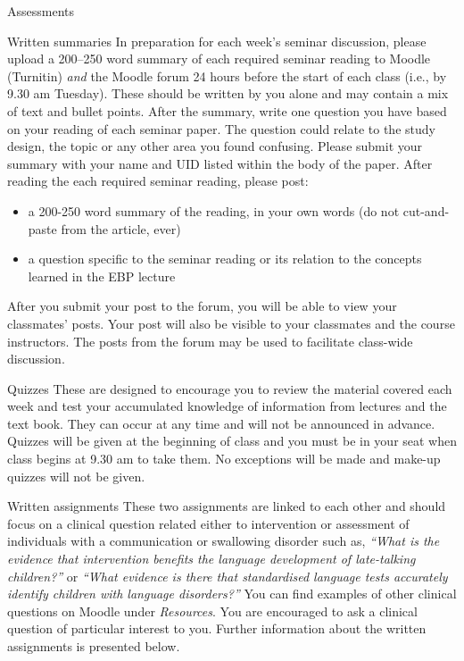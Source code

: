 \documentclass[a4paper, 11pt]{article}
\begin{document}
\begin{labeling}{Assessments}
\item[Written summaries] In preparation for each week's seminar discussion, please upload a 200--250 word summary of each required seminar reading to Moodle (Turnitin) \emph{and} the Moodle forum 24 hours before the start of each class (i.e., by 9.30 am Tuesday). These should be written by you alone and may contain a mix of text and bullet points. After the summary, write one question you have based on your reading of each seminar paper. The question could relate to the study design, the topic or any other area you found confusing. Please submit your summary with your name and UID listed within the body of the paper. After reading the each required seminar reading, please post: 
\begin{itemize}
	\item a 200-250 word summary of the reading, in your own words (do not cut-and-paste from the article, ever)
	\item a question specific to the seminar reading or its relation to the concepts learned in the EBP lecture
\end{itemize}

After you submit your post to the forum, you will be able to view your classmates' posts. Your post will also be visible to your classmates and the course instructors. The posts from the forum may be used to facilitate class-wide discussion. 

\item[Quizzes] These are designed to encourage you to review the material covered each week and test your accumulated knowledge of information from lectures and the text book. They can occur at any time and will not be announced in advance. Quizzes will be given at the beginning of class and you must be in your seat when class begins at 9.30 am to take them. No exceptions will be made and make-up quizzes will not be given.

\item[Written assignments] These two assignments are linked to each other and should focus on a clinical question related either to intervention or assessment of individuals with a communication or swallowing disorder such as, \emph{``What is the evidence that intervention benefits the language development of late-talking children?''} or \emph{``What evidence is there that standardised language tests accurately identify children with language disorders?''} You can find examples of other clinical questions on Moodle under \emph{Resources}. You are encouraged to ask a clinical question of particular interest to you. Further information about the written assignments is presented below.

\end{labeling}
\end{document}
